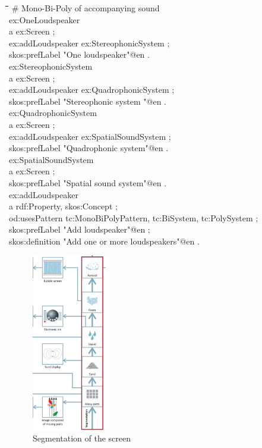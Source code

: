 \documentclass[11pt,a4paper]{article}
\newenvironment{code}{\tt \begin{tabbing}
\hskip12pt\=\hskip12pt\=\hskip12pt\=\hskip12pt\=\hskip5cm\=\hskip5cm\=\kill}
{\end{tabbing}}
\begin{document}
\begin{code}
\# Mono-Bi-Poly of accompanying sound\\
ex:OneLoudspeaker \\
\> a ex:Screen ;\\
\> ex:addLoudspeaker ex:StereophonicSystem ;\\
\> skos:prefLabel "One loudspeaker"@en .\\
ex:StereophonicSystem \\
\> a ex:Screen ; \\
\> ex:addLoudspeaker ex:QuadrophonicSystem ;\\
\> skos:prefLabel "Stereophonic system "@en .\\
ex:QuadrophonicSystem \\
\> a ex:Screen ; \\
\> ex:addLoudspeaker ex:SpatialSoundSystem ;\\
\> skos:prefLabel "Quadrophonic system"@en .\\
ex:SpatialSoundSystem\\
\> a ex:Screen ; \\
\> skos:prefLabel "Spatial sound system"@en .\\

ex:addLoudspeaker\\
\> a rdf:Property, skos:Concept ;\\
\> od:usesPattern tc:MonoBiPolyPattern, tc:BiSystem, tc:PolySystem ;\\
\> skos:prefLabel "Add loudspeaker"@en ;\\
\> skos:definition "Add one or more loudspeakers"@en .\\
\end{code}

\begin{figure}
  \begin{center}
    \includegraphics[width=0.3\textwidth]{figures/segmentation.png}
  \end{center}
  \caption{\small Segmentation of the screen \cite{Shpakovsky2016}}
  \label{fig:segmentation}
\end{figure}
\end{document}
